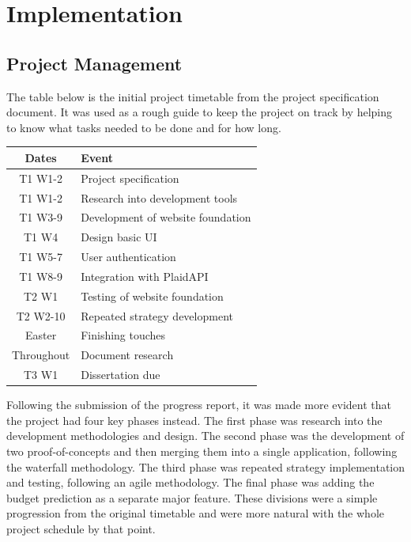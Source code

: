 \chapter{Implementation}
\label{ch:implementation}

\section{Project Management}
The table below is the initial project timetable from the project specification document. It was used as a rough guide to keep the project on track by helping to know what tasks needed to be done and for how long.

\begin{center}
	\begin{tabular}{ | c | l | }
		\hline
		\textbf{Dates} & \textbf{Event}                    \\ \hline
		T1 W1-2        & Project specification             \\ \hline
		T1 W1-2        & Research into development tools   \\ \hline
		T1 W3-9        & Development of website foundation \\ \hline
		T1 W4          & Design basic UI                   \\ \hline
		T1 W5-7        & User authentication               \\ \hline
		T1 W8-9        & Integration with PlaidAPI         \\ \hline
		T2 W1          & Testing of website foundation     \\ \hline
		T2 W2-10       & Repeated strategy development     \\ \hline
		Easter         & Finishing touches                 \\ \hline
		Throughout     & Document research                 \\ \hline
		T3 W1          & Dissertation due                  \\ \hline
	\end{tabular}
\end{center}

Following the submission of the progress report, it was made more evident that the project had four key phases instead. The first phase was research into the development methodologies and design. The second phase was the development of two proof-of-concepts and then merging them into a single application, following the waterfall methodology. The third phase was repeated strategy implementation and testing, following an agile methodology. The final phase was adding the budget prediction as a separate major feature. These divisions were a simple progression from the original timetable and were more natural with the whole project schedule by that point.

